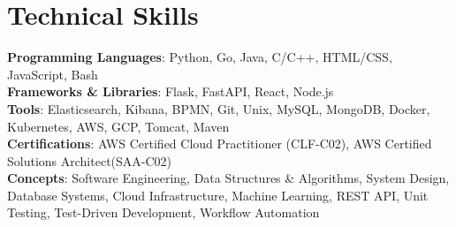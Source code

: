 \documentclass[letterpaper,11pt]{article}
\begin{document}
\section{Technical Skills}
 \begin{itemize}[leftmargin=0.15in, label={}]
    \small{\item{
     \textbf{Programming Languages}{: Python, Go, Java, C/C++, HTML/CSS, JavaScript, Bash} \\
     \textbf{Frameworks \& Libraries}{: Flask, FastAPI, React, Node.js} \\
     \textbf{Tools}{: Elasticsearch, Kibana, BPMN, Git, Unix, MySQL, MongoDB, Docker, Kubernetes, AWS, GCP, Tomcat, Maven} \\
     \textbf{Certifications}{: AWS Certified Cloud Practitioner (CLF-C02), AWS Certified Solutions Architect(SAA-C02) } \\
     \textbf{Concepts}{: Software Engineering, Data Structures \& Algorithms, System Design, Database Systems, Cloud 
                            Infrastructure, Machine Learning, REST API, Unit Testing, Test-Driven Development, Workflow Automation}
    }}
 \end{itemize}


\end{document}
